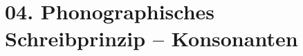 \documentclass[handout,aspectratio=1610,dvipsnames]{beamer}
\begin{document}
  \section{04. Phonographisches Schreibprinzip -- Konsonanten}
  \let\woopsi\section\let\section\subsection\let\subsection\subsubsection
  
  \let\subsection\section\let\section\woopsi
  
\end{document}
